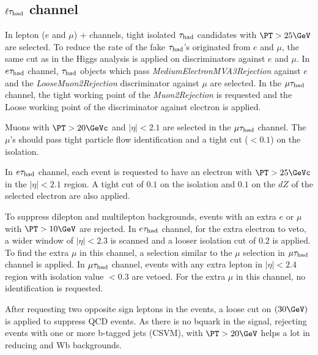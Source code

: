 \subsection{\texorpdfstring{$\ell\tau_{\rm had}$ channel}{lepton-tau channel}}
\label{sect:leptonTauCuts}
In lepton ($e$ and $\mu$) $+$ \Tau channels, tight isolated $\tau_{\rm had}$ candidates with $\PT > 25 \GeV$  are selected. To reduce the rate of the fake $\tau_{\rm had}$'s originated from $e$ and $\mu$, the same cut as in the Higgs analysis \cite{CMS_AN_2013-171} is applied on discriminators against $e$ and $\mu$. In $e\tau_{\rm had}$ channel, $\tau_{\rm had}$ objects which pass \emph{MediumElectronMVA3Rejection} against $e$ and the \emph{LooseMuon2Rejection} discriminator against $\mu$ are selected. In the $\mu\tau_{\rm had}$ channel, the tight working point of the \emph{Muon2Rejection} is requested and the Loose working point of the discriminator against electron is applied.

Muons with $\PT > 20 \GeVc$ and $|\eta|<2.1$ are selected in the $\mu\tau_{\rm had}$ channel. The $\mu$'s should pass tight particle flow identification and a tight cut ($<0.1$) on the isolation.
 
In $e\tau_{\rm had}$ channel, each event is requested to have an electron with $\PT >25 \GeVc$ in the $|\eta| < 2.1 $ region. A tight cut of $0.1$ on the isolation and $0.1$ on the $dZ$ of the selected electron are also applied.

To suppress dilepton and multilepton backgrounds, events with an extra $e$ or $\mu$ with $\PT >10 \GeV$ are rejected. In $e\tau_{\rm had}$ channel, for the extra electron to veto, a wider window of $|\eta|<2.3$ is scanned and a looser isolation cut of $0.2$ is applied. To find the extra $\mu$ in this channel, a selection similar to the $\mu$ selection in $\mu\tau_{\rm had}$ channel is applied. In $\mu\tau_{\rm had}$ channel, events with any extra lepton in $|\eta|<2.4$ region with isolation value $<0.3$ are vetoed. For the extra $\mu$ in this channel, no identification is requested.


After requesting two opposite sign leptons in the events, a loose cut on \MET $(30 \GeV)$ is applied to suppress QCD events. As there is no bquark in the signal, rejecting events with one or more b-tagged jets (CSVM), with $\PT > 20 \GeV$ helps a lot in reducing \ttbar and Wb backgrounds.

